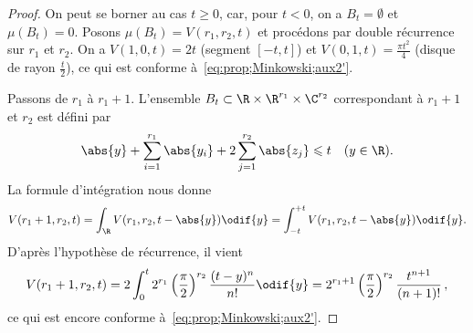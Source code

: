 \documentclass[11pt, %
  title in boldface,
  theorem in new line,
  theorem numbering = section,
  number theorems separately,
  simple name,
]{beaulivre}
\begin{document}
    \begin{proof}
        On peut se borner au cas \( t \geqslant 0 \), car, pour \( t < 0 \), on a \( B_t = \emptyset \) et \( \mu(B_t) = 0 \). Posons \( \mu(B_t) = V(r_1, r_2, t) \) et procédons par double récurrence sur \( r_1 \) et \( r_2 \). On a \( V(1,0,t) = 2t \) (segment \( [-t,t] \)) et \( V(0,1,t) = \frac{\pi t^2}{4} \) (disque de rayon \( \frac{t}{2} \)), ce qui est conforme à~\eqref{eq:prop;Minkowski;aux2'}.

        Passons de \( r_1 \) à \( r_1 + 1 \). L'ensemble \( B_t \subset \R \times \R^{r_1} \times \C^{r_2} \) correspondant à \( r_1 + 1 \) et \( r_2 \) est défini par
        {\[\setlength{\abovedisplayskip}{.5\baselineskip}%
        \setlength{\belowdisplayskip}{.5\baselineskip}%
            \abs{y} + \sum_{i=1}^{r_1} \abs{y_i} + 2 \sum_{j=1}^{r_2} \abs{z_j} \leqslant t \quad \text{(\( y \in \R \))}.
        \]}%
        La formule d'intégration  nous donne
        {\[\setlength{\abovedisplayskip}{.5\baselineskip}%
        \setlength{\belowdisplayskip}{.5\baselineskip}%
            V(r_1+1,r_2,t) = \int_{\R} V(r_1,r_2,t-\abs{y}) \odif{y} = \int_{-t}^{+t} V(r_1,r_2,t-\abs{y}) \odif{y}.
        \]}%
        D'après l'hypothèse de récurrence, il vient
        {\[\setlength{\abovedisplayskip}{.5\baselineskip}%
        \setlength{\belowdisplayskip}{.5\baselineskip}%
            V(r_1+1,r_2,t) = 2 \int_0^t 2^{r_1} \left(\frac{\pi}{2}\right)^{r_2} \frac{(t-y)^n}{n!} \odif{y} = 2^{r_1+1} \left(\frac{\pi}{2}\right)^{r_2} \frac{t^{n+1}}{(n+1)!}\,,
        \]}%
        ce qui est encore conforme à~\eqref{eq:prop;Minkowski;aux2'}.


\end{proof}
\end{document}
